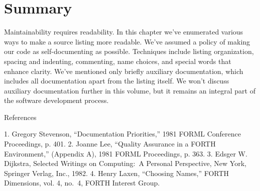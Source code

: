 \section{Summary}

Maintainability requires readability.  In this chapter we've enumerated
various ways to make a source listing more readable.  We've assumed a
policy of making our code as self-documenting as possible.  Techniques include
listing organization, spacing and indenting, commenting, name
choices, and special words that enhance clarity.
We've mentioned only briefly auxiliary documentation, which includes
all documentation apart from the listing itself.  We won't discuss
auxiliary documentation further in this volume, but it remains an integral
part of the software development process.

References

1. Gregory Stevenson, ``Documentation Priorities,'' 1981 FORML Conference
Proceedings, p. 401.
2. Joanne Lee, ``Quality Assurance in a FORTH Environment,'' (Appendix
A), 1981 FORML Proceedings, p. 363.
3. Edsger W. Dijkstra, Selected Writings on Computing:\ A Personal Perspective,
New York, Springer Verlag, Inc., 1982.
4. Henry Laxen, ``Choosing Names,'' FORTH Dimensions, vol. 4, no.\ 4,
FORTH Interest Group.

